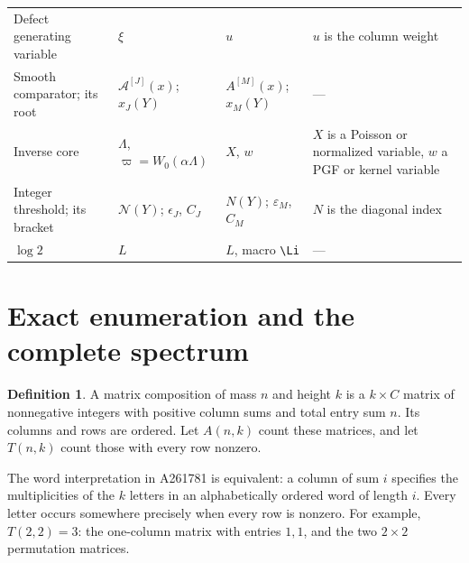 \documentclass[11pt]{article}
\numberwithin{equation}{section}
\theoremstyle{definition}
\newtheorem{definition}[theorem]{Definition}
\theoremstyle{remark}
\begin{document}
{\begin{longtable}{@{}>{\raggedright\arraybackslash}p{}>{\raggedright\arraybackslash}p{}>{\raggedright\arraybackslash}p{}>{\raggedright\arraybackslash}p{}@{}}
Defect generating variable & $\xi$ & $u$ & $u$ is the column weight\\
Smooth comparator; its root & $\mathcal A^{[J]}(x)$; $x_J(Y)$ & $A^{[M]}(x)$; $x_M(Y)$ & ---\\
Inverse core & $\Lambda$, $\varpi=W_0(\alpha\Lambda)$ & $X$, $w$ & $X$ is a Poisson or normalized variable, $w$ a PGF or kernel variable\\
Integer threshold; its bracket & $\mathcal N(Y)$; $\epsilon_J$, $C_J$ & $N(Y)$; $\varepsilon_M$, $C_M$ & $N$ is the diagonal index\\
$\log 2$ & $L$ & $L$, macro \texttt{\textbackslash Li} & ---\\
\end{longtable}
}

\section{Exact enumeration and the complete spectrum}\label{mxc:sec:exact}

\begin{definition}
A matrix composition of mass $n$ and height $k$ is a $k\times C$ matrix
of nonnegative integers with positive column sums and total entry sum $n$.
Its columns and rows are ordered. Let $A(n,k)$ count these matrices, and
let $T(n,k)$ count those with every row nonzero.
\end{definition}

The word interpretation in A261781 is equivalent: a column of sum $i$
specifies the multiplicities of the $k$ letters in an alphabetically
ordered word of length $i$. Every letter occurs somewhere precisely when
every row is nonzero. For example, $T(2,2)=3$: the one-column matrix
with entries $1,1$, and the two $2\times2$ permutation matrices.
\end{document}
